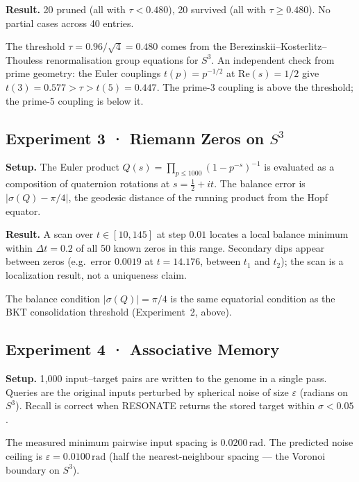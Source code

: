 \documentclass[12pt,a4paper]{article}
\theoremstyle{definition}
\theoremstyle{remark}
\begin{document}
\textbf{Result.} 20 pruned (all with $\tau < 0.480$), 20 survived (all with
$\tau \geq 0.480$). No partial cases across 40 entries.

The threshold $\tau = 0.96/\!\sqrt{4} = 0.480$ comes from the
Berezinskii--Kosterlitz--Thouless renormalisation group equations for $S^3$.
An independent check from prime geometry: the Euler couplings
$t(p) = p^{-1/2}$ at $\mathrm{Re}(s) = 1/2$ give
$t(3) = 0.577 > \tau > t(5) = 0.447$.
The prime-3 coupling is above the threshold; the prime-5 coupling is below it.

\subsection{Experiment 3 · Riemann Zeros on $S^3$}
\label{app:exp3}

\textbf{Setup.} The Euler product
$Q(s) = \prod_{p \leq 1000}(1-p^{-s})^{-1}$
is evaluated as a composition of quaternion rotations at $s = \frac{1}{2}+it$.
The balance error is $|\sigma(Q) - \pi/4|$, the geodesic distance of the
running product from the Hopf equator.

\textbf{Result.} A scan over $t \in [10, 145]$ at step $0.01$ locates a local
balance minimum within $\Delta t = 0.2$ of all 50 known zeros in this range.
Secondary dips appear between zeros (e.g.\ error $0.0019$ at $t = 14.176$,
between $t_1$ and $t_2$); the scan is a localization result, not a uniqueness claim.

The balance condition $|\sigma(Q)| = \pi/4$ is the same equatorial condition
as the BKT consolidation threshold (Experiment~2, above).

\subsection{Experiment 4 · Associative Memory}
\label{app:exp4}

\textbf{Setup.} 1{,}000 input--target pairs are written to the genome in a
single pass. Queries are the original inputs perturbed by spherical noise of
size $\varepsilon$ (radians on $S^3$). Recall is correct when RESONATE returns
the stored target within $\sigma < 0.05$.

The measured minimum pairwise input spacing is $0.0200\,\mathrm{rad}$.
The predicted noise ceiling is $\varepsilon = 0.0100\,\mathrm{rad}$
(half the nearest-neighbour spacing --- the Voronoi boundary on $S^3$).
\end{document}
